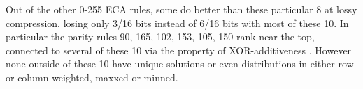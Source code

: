 \documentclass[11pt]{article}
\begin{document}
Out of the other 0-255 ECA rules, some do better than these particular 8 at lossy compression, losing only 3/16 bits instead of 6/16 bits with most of these 10. In particular the parity rules 90, 165, 102, 153, 105, 150 rank near the top, connected to several of these 10 via the property of XOR-additiveness \cite{xorAdditive}. However none outside of these 10 have unique solutions or even distributions in either row or column weighted, maxxed or minned.\\



\end{document}
